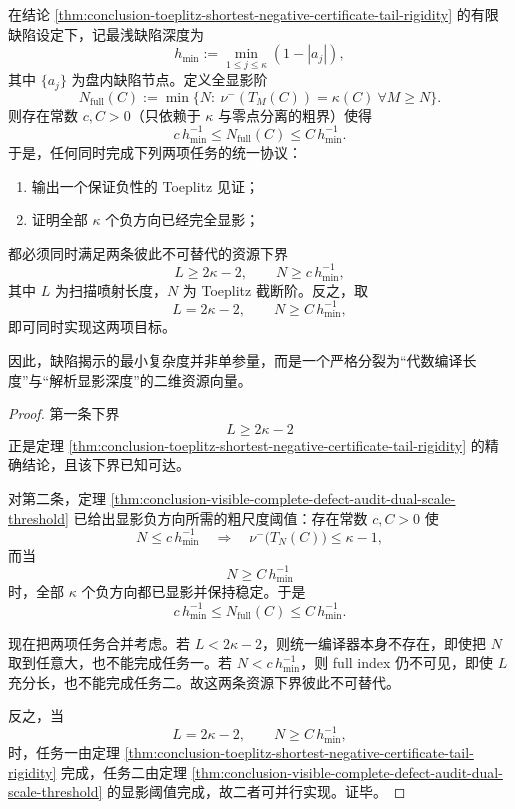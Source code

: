 \begin{theorem}[缺陷显影的双参数不可约律]\label{thm:conclusion-toeplitz-defect-revelation-two-parameter-irreducibility}
在结论 \ref{thm:conclusion-toeplitz-shortest-negative-certificate-tail-rigidity} 的有限缺陷设定下，记最浅缺陷深度为
\[
h_{\min}:=\min_{1\le j\le \kappa}(1-|a_j|),
\]
其中 \(\{a_j\}\) 为盘内缺陷节点。定义全显影阶
\[
N_{\mathrm{full}}(C):=\min\{N:\ \nu^{-}(T_M(C))=\kappa(C)\ \forall M\ge N\}.
\]
则存在常数 \(c,C>0\)（只依赖于 \(\kappa\) 与零点分离的粗界）使得
\[
c\,h_{\min}^{-1}\le N_{\mathrm{full}}(C)\le C\,h_{\min}^{-1}.
\]
于是，任何同时完成下列两项任务的统一协议：
\begin{enumerate}
  \item 输出一个保证负性的 Toeplitz 见证；
  \item 证明全部 \(\kappa\) 个负方向已经完全显影；
\end{enumerate}
都必须同时满足两条彼此不可替代的资源下界
\[
L\ge 2\kappa-2,
\qquad
N\ge c\,h_{\min}^{-1},
\]
其中 \(L\) 为扫描喷射长度，\(N\) 为 Toeplitz 截断阶。反之，取
\[
L=2\kappa-2,
\qquad
N\ge C\,h_{\min}^{-1},
\]
即可同时实现这两项目标。

因此，缺陷揭示的最小复杂度并非单参量，而是一个严格分裂为“代数编译长度”与“解析显影深度”的二维资源向量。
\end{theorem}
\begin{proof}
第一条下界
\[
L\ge 2\kappa-2
\]
正是定理 \ref{thm:conclusion-toeplitz-shortest-negative-certificate-tail-rigidity} 的精确结论，且该下界已知可达。

对第二条，定理 \ref{thm:conclusion-visible-complete-defect-audit-dual-scale-threshold} 已给出显影负方向所需的粗尺度阈值：存在常数 \(c,C>0\) 使
\[
N\le c\,h_{\min}^{-1}
\quad\Longrightarrow\quad
\nu^{-}\!\bigl(T_N(C)\bigr)\le \kappa-1,
\]
而当
\[
N\ge C\,h_{\min}^{-1}
\]
时，全部 \(\kappa\) 个负方向都已显影并保持稳定。于是
\[
c\,h_{\min}^{-1}\le N_{\mathrm{full}}(C)\le C\,h_{\min}^{-1}.
\]

现在把两项任务合并考虑。若 \(L<2\kappa-2\)，则统一编译器本身不存在，即使把 \(N\) 取到任意大，也不能完成任务一。若 \(N<c\,h_{\min}^{-1}\)，则 full index 仍不可见，即使 \(L\) 充分长，也不能完成任务二。故这两条资源下界彼此不可替代。

反之，当
\[
L=2\kappa-2,
\qquad
N\ge C\,h_{\min}^{-1},
\]
时，任务一由定理 \ref{thm:conclusion-toeplitz-shortest-negative-certificate-tail-rigidity} 完成，任务二由定理 \ref{thm:conclusion-visible-complete-defect-audit-dual-scale-threshold} 的显影阈值完成，故二者可并行实现。证毕。
\end{proof}

